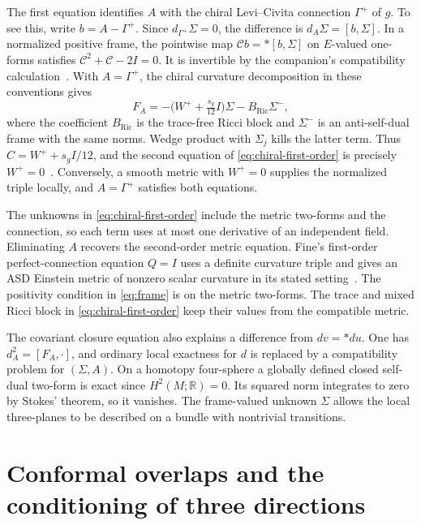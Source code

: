 \documentclass[11pt]{article}
\numberwithin{equation}{section}
\begin{document}
The first equation identifies \(A\) with the chiral Levi--Civita
connection \(\Gamma^+\) of \(g\). To see this, write
\(b=A-\Gamma^+\). Since \(d_{\Gamma^+}\Sigma=0\), the difference is
\(d_A\Sigma=[b,\Sigma]\). In a normalized positive frame, the
pointwise map \(\mathscr C b=*[b,\Sigma]\) on \(E\)-valued
one-forms satisfies \(\mathscr C^2+\mathscr C-2I=0\).
It is invertible by the companion's compatibility
calculation~\cite[Section~4.4, compatibility proposition]{Baker2026ChiralMetricEvolution}.
With \(A=\Gamma^+\), the chiral curvature decomposition in these
conventions gives
\[
 F_A=-\bigl(W^++\tfrac{s_g}{12}I\bigr)\Sigma
      -B_{\mathrm{Ric}}\Sigma^-,
\]
where the coefficient \(B_{\mathrm{Ric}}\) is the trace-free Ricci
block and \(\Sigma^-\) is an anti-self-dual frame with the same
norms. Wedge product with \(\Sigma_j\) kills the latter
term. Thus \(C=W^++s_g I/12\), and the second equation of
\eqref{eq:chiral-first-order} is precisely
\(W^+=0\)~\cite[Section~5, chiral curvature decomposition]{Baker2026ChiralMetricEvolution}.
Conversely, a smooth metric with \(W^+=0\) supplies the normalized
triple locally, and \(A=\Gamma^+\) satisfies both equations.

The unknowns in \eqref{eq:chiral-first-order} include the metric
two-forms and the connection, so each term uses at most one
derivative of an independent field. Eliminating \(A\) recovers the
second-order metric equation. Fine's first-order perfect-connection
equation \(Q=I\) uses a definite curvature triple and gives an ASD
Einstein metric of nonzero scalar curvature in its stated
setting~\cite[Sections~1.3 and~1.6]{Fine2011}. The positivity
condition in \eqref{eq:frame} is on the metric two-forms. The
trace and mixed Ricci block in \eqref{eq:chiral-first-order}
keep their values from the compatible metric.

The covariant closure equation also explains a difference from
\(dv=*du\). One has \(d_A^2=[F_A,\cdot]\), and ordinary local
exactness for \(d\) is replaced by a compatibility problem for
\((\Sigma,A)\). On a homotopy four-sphere a globally defined
closed self-dual two-form is exact since \(H^2(M;\mathbb R)=0\).
Its squared norm integrates to zero by Stokes' theorem, so it
vanishes. The frame-valued unknown \(\Sigma\) allows the local
three-planes to be described on a bundle with nontrivial
transitions.

\section{Conformal overlaps and the conditioning of three directions}
\label{sec:overlap}
\end{document}
